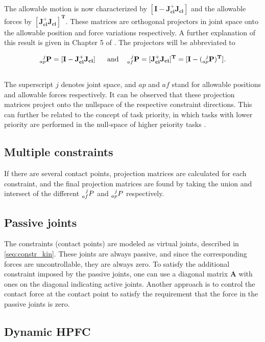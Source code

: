 The allowable motion is now characterized by $\mathbf{[I - J_{ci}^+ J_{ci}]}$ and the allowable forces by $\mathbf{[J_{ci}^+ J_{ci}]^T}$. These matrices are orthogonal projectors in joint space onto the allowable position and force variations respectively. A further explanation of this result is given in Chapter 5 of \cite{west1985method}. The projectors will be abbreviated to

\begin{equation}\label{eq:proj_mtrices}
    \mathbf{
    \prescript{j}{ap}{P} = [I - J_{ci}^+ J_{ci}] \ \ \quad \textrm{and} \quad
    \prescript{j}{af}{P} = [J_{ci}^+ J_{ci}]^T = [I - (\prescript{j}{ap}{P})^T]
    }.
\end{equation}
\\
The superscript $j$ denotes joint space, and $ap$ and $af$ stand for allowable positions and allowable forces respectively. It can be observed that these projection matrices project onto the nullspace of the respective constraint directions. This can further be related to the concept of task priority, in which tasks with lower priority are performed in the null-space of higher priority tasks \cite{chiaverini2008kinematically}.

\subsection{Multiple constraints}\label{subseq:mult_contacts}

If there are several contact points, projection matrices are calculated for each constraint, and the final projection matrices are found by taking the union and intersect of the different $\prescript{j}{af}{P}$ and $\prescript{j}{ap}{P}$ respectively.

\subsection{Passive joints}
The constraints (contact points) are modeled as virtual joints, described in \ref{seq:constr_kin}. These joints are always passive, and since the corresponding forces are uncontrollable, they are always zero. To satisfy the additional constraint imposed by the passive joints, one can use a diagonal matrix $\mathbf{A}$ with ones on the diagonal indicating active joints. Another approach is to control the contact force at the contact point to satisfy the requirement that the force in the passive joints is zero.

\subsection{Dynamic HPFC}\label{subseq:dynhpfc}

